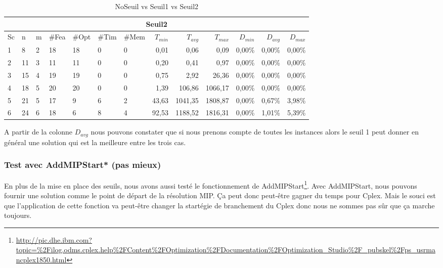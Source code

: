 \documentclass[twoside,fleqn]{EPURapport}
\begin{document}
\begin{table}[h]
\medskip \par
    \begin{tabular}{|l|l|l|l|l|l|l|r|r|r|r|r|r|}
    	\hline
    	\multicolumn{13}{|c|}{Seuil2}\\ \hline
Sc &	n	&m	&\#Fea	&\#Opt	&\#Tim &\#Mem	&$T_{min}$ & $T_{avg}$	& $T_{max}$ & $D_{min}$ & $D_{avg}$	& $D_{max}$ \\ \hline
1&	8 &	2&	18&	18&	0&	0&	0,01&	0,06&	0,09	&0,00\%&	0,00\%&	0,00\%    \\ \hline
2&	11&	3&	11&	11&	0&	0&	0,20&	0,41&	0,97	&0,00\%&	0,00\%&	0,00\%     \\ \hline
3&	15&	4&	19&	19&	0&	0&	0,75&	2,92&	26,36	&0,00\%&	0,00\%&	0,00\%  \\ \hline
4&	18&	5&	20&	20&	0&	0&	1,39	&106,86	&1066,17	&0,00\%&	0,00\%&	0,00\%     \\ \hline
5&	21&	5&	17&	9 &	6&	2&	43,63	&1041,35&	1808,87	&0,00\%&	0,67\%&	3,98\%     \\ \hline
6&	24&	6&	18&	6 &	8&	4&	92,53	&1188,52&	1816,31	&0,00\%&	1,01\%&	5,39\%     \\ \hline
    \end{tabular}
    \caption{NoSeuil vs Seuil1 vs Seuil2}
    \label{tab_cut2_s2_tab2}
\end{table}
\bigskip
A partir de la colonne $D_{avg}$ nous pouvons constater que si nous prenons compte de toutes les instances alors le seuil 1 peut donner en général une solution qui est la meilleure entre les trois cas.



\subsubsection{Test avec AddMIPStart* (pas mieux)}
En plus de la mise en place des seuils, nous avons aussi testé le fonctionnement de AddMIPStart\footnote{\url{http://pic.dhe.ibm.com?topic=\%2Filog.odms.cplex.help\%2FContent\%2FOptimization\%2FDocumentation\%2FOptimization_Studio\%2F_pubskel\%2Fps_usrmancplex1850.html}}. Avec AddMIPStart, nous pouvons fournir une solution comme le point de départ de la résolution MIP. Ça peut donc peut-être gagner du temps pour Cplex. Mais le souci est que l'application de cette fonction va peut-être changer la startégie de branchement du Cplex donc nous ne sommes pas sûr que ça marche toujours.
\end{document}
